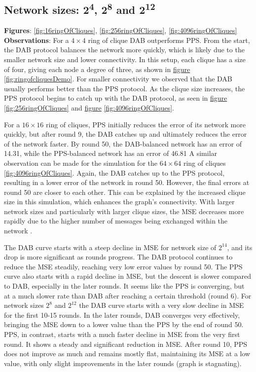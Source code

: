 \subsection{Network sizes: 2\textsuperscript{4}, 2\textsuperscript{8} and 2\textsuperscript{12}}
\textbf{Figures}: \ref{fig:16ringOfCliques}, \ref{fig:256ringOfCliques}, \ref{fig:4096ringOfCliques}\\
\textbf{Observations}: For a $4\times4$ ring of clique DAB outperforms PPS. From the start, the DAB protocol balances the network more quickly, which is likely due to the smaller network size and lower connectivity. In this setup, each clique has a size of four, giving each node a degree of three, as shown in \hyperref[fig:ringofcliquesDemo]{figure} \ref{fig:ringofcliquesDemo}. For smaller connectivity we observed that the DAB usually performs better than the PPS protocol. As the clique size increases, the PPS protocol begins to catch up with the DAB protocol, as seen in \hyperref[fig:256ringOfCliques]{figure} \ref{fig:256ringOfCliques} and \hyperref[fig:4096ringOfCliques]{figure} \ref{fig:4096ringOfCliques}.

For a $16\times16$ ring of cliques, PPS initially reduces the error of its network more quickly, but after round 9, the DAB catches up and ultimately reduces the error of the network faster. By round 50, the DAB-balanced network has an error of 14.31, while the PPS-balanced network has an error of 46.81 A similar observation can be made for the simulation for the $64 \times 64$ ring of cliques \ref{fig:4096ringOfCliques}. Again, the DAB catches up to the PPS protocol, resulting in a lower error of the network in round 50. However, the final errors at round 50 are closer to each other. This can be explained by the increased clique size in this simulation, which enhances the graph's connectivity. With larger network sizes and particularly with larger clique sizes, the MSE decreases more rapidly due to the higher number of messages being exchanged within the network \cite{nugroho2023PushPullSumDataAg}.

The DAB curve starts with a steep decline in MSE for network size of $2^{14}$, and its drop is more significant as rounds progress. The DAB protocol continues to reduce the MSE steadily, reaching very low error values by round 50. The PPS curve also starts with a rapid decline in MSE, but the descent is slower compared to DAB, especially in the later rounds. It seems like the PPS is converging, but at a much slower rate than DAB after reaching a certain threshold (round 6). For network sizes $2^{8}$ and $2^{12}$ the DAB curve starts with a very slow decline in MSE for the first 10-15 rounds. In the later rounds, DAB converges very effectively, bringing the MSE down to a lower value than the PPS by the end of round 50. PPS, in contrast, starts with a much faster decline in MSE from the very first round. It shows a steady and significant reduction in MSE. After round 10, PPS does not improve as much and remains mostly flat, maintaining its MSE at a low value, with only slight improvements in the later rounds (graph is stagnating).

